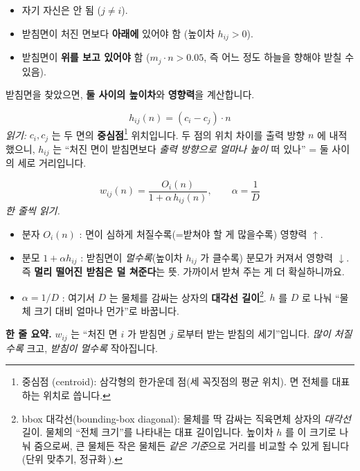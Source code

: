 \documentclass[11pt,a4paper]{article}
\begin{document}
\begin{itemize}[leftmargin=1.6em]
\item 자기 자신은 안 됨 ($j \neq i$).
\item 받침면이 처진 면보다 \textbf{아래에} 있어야 함 (높이차 $h_{ij}>0$).
\item 받침면이 \textbf{위를 보고 있어야} 함 ($m_j\cdot n>0.05$, 즉 어느 정도
하늘을 향해야 받칠 수 있음).
\end{itemize}

받침면을 찾았으면, \textbf{둘 사이의 높이차}와 \textbf{영향력}을 계산합니다.

\begin{equation}
h_{ij}(n)=(c_i-c_j)\cdot n
\label{eq:height}
\end{equation}
\noindent\textit{읽기:} $c_i, c_j$ 는 두 면의 \textbf{중심점}\footnote{중심점
(centroid): 삼각형의 한가운데 점(세 꼭짓점의 평균 위치). 면 전체를 대표하는 위치로
씁니다.} 위치입니다. 두 점의 위치 차이를 출력 방향 $n$ 에 내적했으니, $h_{ij}$ 는
``처진 면이 받침면보다 \emph{출력 방향으로 얼마나 높이} 떠 있나'' = 둘 사이의
세로 거리입니다.

\begin{equation}
w_{ij}(n)=\frac{O_i(n)}{1+\alpha\,h_{ij}(n)},
\qquad \alpha=\frac{1}{D}
\label{eq:w}
\end{equation}
\noindent\textit{한 줄씩 읽기.}
\begin{itemize}[leftmargin=1.6em]
\item 분자 $O_i(n)$ : 면이 심하게 처질수록(=받쳐야 할 게 많을수록) 영향력 $\uparrow$.
\item 분모 $1+\alpha h_{ij}$ : 받침면이 \emph{멀수록}(높이차 $h_{ij}$ 가 클수록)
분모가 커져서 영향력 $\downarrow$. 즉 \textbf{멀리 떨어진 받침은 덜 쳐준다}는 뜻.
가까이서 받쳐 주는 게 더 확실하니까요.
\item $\alpha=1/D$ : 여기서 $D$ 는 물체를 감싸는 상자의 \textbf{대각선
길이}\footnote{bbox 대각선(bounding-box diagonal): 물체를 딱 감싸는 직육면체 상자의
\emph{대각선} 길이. 물체의 ``전체 크기''를 나타내는 대표 길이입니다. 높이차 $h$ 를
이 크기로 나눠 줌으로써, 큰 물체든 작은 물체든 \emph{같은 기준}으로 거리를 비교할 수
있게 됩니다(단위 맞추기, 정규화\,\footnotemark).}. $h$ 를 $D$ 로
나눠 ``물체 크기 대비 얼마나 먼가''로 바꿉니다.
\end{itemize}

\begin{readbox}
\textbf{한 줄 요약.} $w_{ij}$ 는 ``처진 면 $i$ 가 받침면 $j$ 로부터 받는 받침의
세기''입니다. \emph{많이 처질수록} 크고, \emph{받침이 멀수록} 작아집니다.
\end{readbox}
\end{document}
